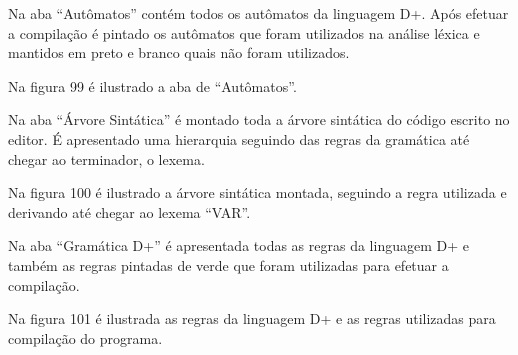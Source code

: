 \documentclass[12pt,oneside,a4paper,chapter=TITLE,section=TITLE,sumario=tradicional]{abntex2}
\begin{document}
Na aba “Autômatos” contém todos os autômatos da linguagem D+. Após efetuar a compilação é pintado os autômatos que foram utilizados na análise léxica e mantidos em preto e branco quais não foram utilizados.

Na figura 99 é ilustrado a aba de “Autômatos”.

\begin{figure}[H]
\end{figure}

Na aba “Árvore Sintática” é montado toda a árvore sintática do código escrito no editor. É apresentado uma hierarquia seguindo das regras da gramática até chegar ao terminador, o lexema.

Na figura 100 é ilustrado a árvore sintática montada, seguindo a regra utilizada e derivando até chegar ao lexema “VAR”.

\begin{figure}[H]
\end{figure}

Na aba “Gramática D+” é apresentada todas as regras da linguagem D+ e também as regras pintadas de verde que foram utilizadas para efetuar a compilação.

Na figura 101 é ilustrada as regras da linguagem D+ e as regras utilizadas para compilação do programa.

\begin{figure}[H]
\end{figure}
\end{document}
